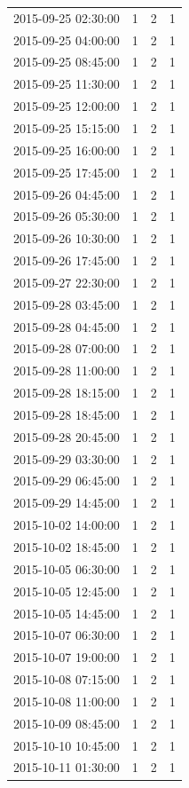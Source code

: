 \begin{tabular}{lrrr}
2015-09-25 02:30:00 & 1 & 2 & 1 \\
2015-09-25 04:00:00 & 1 & 2 & 1 \\
2015-09-25 08:45:00 & 1 & 2 & 1 \\
2015-09-25 11:30:00 & 1 & 2 & 1 \\
2015-09-25 12:00:00 & 1 & 2 & 1 \\
2015-09-25 15:15:00 & 1 & 2 & 1 \\
2015-09-25 16:00:00 & 1 & 2 & 1 \\
2015-09-25 17:45:00 & 1 & 2 & 1 \\
2015-09-26 04:45:00 & 1 & 2 & 1 \\
2015-09-26 05:30:00 & 1 & 2 & 1 \\
2015-09-26 10:30:00 & 1 & 2 & 1 \\
2015-09-26 17:45:00 & 1 & 2 & 1 \\
2015-09-27 22:30:00 & 1 & 2 & 1 \\
2015-09-28 03:45:00 & 1 & 2 & 1 \\
2015-09-28 04:45:00 & 1 & 2 & 1 \\
2015-09-28 07:00:00 & 1 & 2 & 1 \\
2015-09-28 11:00:00 & 1 & 2 & 1 \\
2015-09-28 18:15:00 & 1 & 2 & 1 \\
2015-09-28 18:45:00 & 1 & 2 & 1 \\
2015-09-28 20:45:00 & 1 & 2 & 1 \\
2015-09-29 03:30:00 & 1 & 2 & 1 \\
2015-09-29 06:45:00 & 1 & 2 & 1 \\
2015-09-29 14:45:00 & 1 & 2 & 1 \\
2015-10-02 14:00:00 & 1 & 2 & 1 \\
2015-10-02 18:45:00 & 1 & 2 & 1 \\
2015-10-05 06:30:00 & 1 & 2 & 1 \\
2015-10-05 12:45:00 & 1 & 2 & 1 \\
2015-10-05 14:45:00 & 1 & 2 & 1 \\
2015-10-07 06:30:00 & 1 & 2 & 1 \\
2015-10-07 19:00:00 & 1 & 2 & 1 \\
2015-10-08 07:15:00 & 1 & 2 & 1 \\
2015-10-08 11:00:00 & 1 & 2 & 1 \\
2015-10-09 08:45:00 & 1 & 2 & 1 \\
2015-10-10 10:45:00 & 1 & 2 & 1 \\
2015-10-11 01:30:00 & 1 & 2 & 1 \\

\end{tabular}
